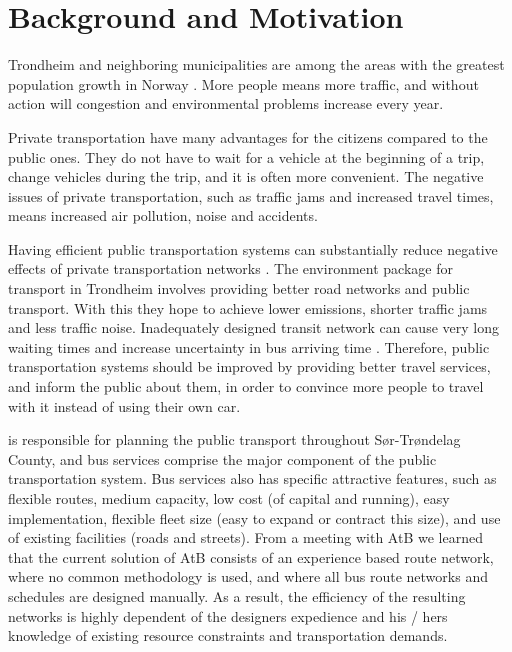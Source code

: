 \section{Background and Motivation}

Trondheim and neighboring municipalities are among the areas with the greatest population growth in Norway \citep{website:miljopakken}. More people means more traffic, and without action will congestion and environmental problems increase every year. 

Private transportation have many advantages for the citizens compared to the public ones. They do not have to wait for a vehicle at the beginning of a trip, change vehicles during the trip, and it is often more convenient. The negative issues of private transportation, such as traffic jams and increased travel times, means increased air pollution, noise and accidents. 

Having efficient public transportation systems can substantially reduce negative effects of private transportation networks 
\citep{kechagiopoulos14} . The environment package \citep{website:miljopakken} for transport in Trondheim involves providing better road networks and public transport. With this they hope to achieve lower emissions, shorter traffic jams and less traffic noise. Inadequately designed transit network can cause very long waiting times and increase uncertainty in bus arriving time \citep{nikolic14}. Therefore, public transportation systems should be improved by providing better travel services, and inform the public about them, in order to convince more people to travel with it instead of using their own car. 

 \citet{website:atb} is responsible for planning the public transport throughout Sør-Trøndelag County, and bus services comprise the major component of the public transportation system. Bus services also has specific attractive features, such as flexible routes, medium capacity, low cost (of capital and running), easy implementation, flexible fleet size (easy to expand or contract this size), and use of existing facilities (roads and streets). From a meeting with AtB we learned that the current solution of AtB consists of an experience based route network, where no common methodology is used, and where all bus route networks and schedules are designed manually. As a result, the efficiency of the resulting networks is highly dependent of the designers expedience and his / hers knowledge of existing resource constraints and transportation demands.

